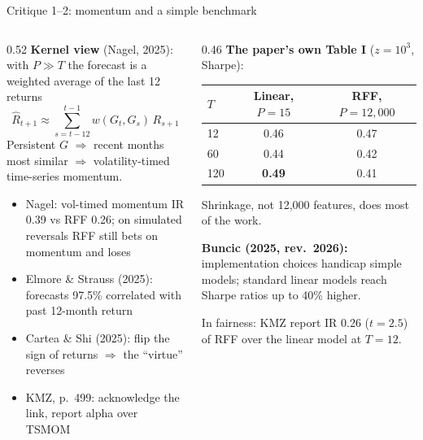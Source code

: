 \documentclass[aspectratio=169,11pt]{beamer}
\newcommand{\hl}[1]{\textcolor{acc}{\textbf{#1}}}
\begin{document}
\begin{frame}{Critique 1--2: momentum and a simple benchmark}
\begin{columns}[T]
\begin{column}{0.52\textwidth}
\footnotesize
\hl{Kernel view} (Nagel, 2025): with $P\gg T$ the forecast is a weighted average of the last 12 returns
\[\hat R_{t+1}\approx\sum_{s=t-12}^{t-1}w(G_t,G_s)\,R_{s+1}\]
Persistent $G$ $\Rightarrow$ recent months most similar $\Rightarrow$ volatility-timed time-series momentum.
\begin{itemize}
\item Nagel: vol-timed momentum IR 0.39 vs RFF 0.26; on simulated reversals RFF still bets on momentum and loses
\item Elmore \& Strauss (2025): forecasts 97.5\% correlated with past 12-month return
\item Cartea \& Shi (2025): flip the sign of returns $\Rightarrow$ the ``virtue'' reverses
\item KMZ, p.~499: acknowledge the link, report alpha over TSMOM
\end{itemize}
\end{column}
\begin{column}{0.46\textwidth}
\footnotesize
\hl{The paper's own Table I} ($z=10^3$, Sharpe):

\smallskip
\centering
\begin{tabular}{lcc}
\toprule
$T$ & Linear, $P=15$ & RFF, $P=12{,}000$\\
\midrule
12  & 0.46 & 0.47\\
60  & 0.44 & 0.42\\
120 & \textbf{0.49} & 0.41\\
\bottomrule
\end{tabular}

\raggedright
\medskip
Shrinkage, not 12{,}000 features, does most of the work.

\smallskip
\hl{Buncic (2025, rev.\ 2026):} implementation choices handicap simple models; standard linear models reach Sharpe ratios up to 40\% higher.

\smallskip
{\scriptsize In fairness: KMZ report IR 0.26 ($t=2.5$) of RFF over the linear model at $T=12$.}
\end{column}
\end{columns}
\end{frame}
\end{document}
